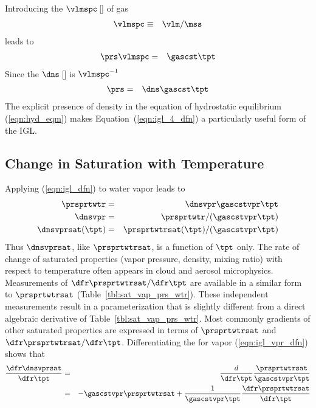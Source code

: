 \documentclass[12pt,twoside]{book}
\begin{document}
Introducing the  $\vlmspc$\,[\mCxkg] of gas
\begin{eqnarray}
\vlmspc & \equiv & \vlm / \mss
\label{eqn:vlm_spc_dfn}
\end{eqnarray}
leads to
\begin{eqnarray}
\prs \vlmspc & = & \gascst \tpt
\label{eqn:igl_3_dfn}
\end{eqnarray}
Since the  $\dns$\,[\kgxmC] is $\vlmspc^{-1}$
\begin{eqnarray}
\prs & = & \dns \gascst \tpt \nonumber \\
\label{eqn:igl_4_dfn}
\end{eqnarray}
The explicit presence of density in the equation of hydrostatic
equilibrium (\ref{eqn:hyd_eqm}) makes Equation~(\ref{eqn:igl_4_dfn}) 
a particularly useful form of the IGL.

\subsection{Change in Saturation with Temperature}\label{sxn:dedT}
Applying (\ref{eqn:igl_dfn}) to water vapor leads to
\begin{eqnarray}
\prsprtwtr & = & \dnsvpr \gascstvpr \tpt \\
\label{eqn:igl_vpr_dfn}
\dnsvpr & = & \prsprtwtr / (\gascstvpr \tpt) \\
\dnsvprsat(\tpt) & = & \prsprtwtrsat(\tpt) / (\gascstvpr \tpt) 
\label{eqn:dns_vpr_sat_dfn}
\end{eqnarray}
Thus $\dnsvprsat$, like $\prsprtwtrsat$, is a function of $\tpt$ only.  
The rate of change of saturated properties (vapor pressure, density, 
mixing ratio) with respect to temperature often appears in cloud and
aerosol microphysics.
Measurements of $\dfr\prsprtwtrsat/\dfr\tpt$ are available in a
similar form to $\prsprtwtrsat$ (Table~\ref{tbl:sat_vap_prs_wtr}).  
These independent measurements result in a parameterization that is
slightly different from a direct algebraic derivative of
Table~\ref{tbl:sat_vap_prs_wtr}. 
Most commonly gradients of other saturated properties are expressed in
terms of $\prsprtwtrsat$ and $\dfr\prsprtwtrsat/\dfr\tpt$. 
Differentiating the  for vapor
(\ref{eqn:igl_vpr_dfn}) shows that
\begin{eqnarray}
\frac{\dfr\dnsvprsat}{\dfr\tpt} & = & \frac{d}{\dfr\tpt}
\frac{\prsprtwtrsat}{\gascstvpr \tpt} \nonumber \\
& = & -\gascstvpr \prsprtwtrsat + \frac{1}{\gascstvpr \tpt} 
\frac{\dfr\prsprtwtrsat}{\dfr\tpt}
\label{eqn:ddnsvprsatdt_dfn}
\end{eqnarray}
\end{document}
